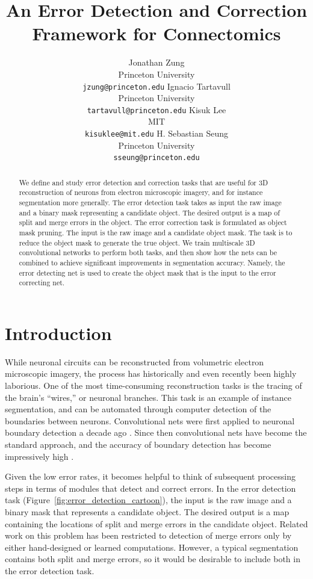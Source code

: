 \documentclass{article}
\title{An Error Detection and Correction Framework for Connectomics}
\author{
	Jonathan Zung\\
	Princeton University\\
	{\tt jzung@princeton.edu}
	\And
	Ignacio Tartavull\\
	Princeton University\\
	{\tt tartavull@princeton.edu}
	\And
	Kisuk Lee\\
	MIT\\
	{\tt kisuklee@mit.edu}
	\And
    H. Sebastian Seung\\
	Princeton University\\
	{\tt sseung@princeton.edu}
}
\begin{document}
\maketitle

\begin{abstract}
We define and study error detection and correction tasks that are
useful for 3D reconstruction of neurons from electron microscopic
imagery, and for instance segmentation more generally.  The error
detection task takes as input the raw image and a binary mask
representing a candidate object. The desired output is a map of split
and merge errors in the object. The error correction task is
formulated as object mask pruning. The input is the raw image
and a candidate object mask. The task is to reduce the object mask to
generate the true object. We train multiscale 3D convolutional
networks to perform both tasks, and then show how the nets can be
combined to achieve significant improvements in segmentation
accuracy. Namely, the error detecting net is used to create the
object mask that is the input to the error correcting net.
\end{abstract}

\section{Introduction}
While neuronal circuits can be reconstructed from volumetric electron
microscopic imagery, the process has historically
\cite{white1986structure} and even recently \cite{schmidt2017axonal}
been highly laborious. One of the most time-consuming reconstruction
tasks is the tracing of the brain's ``wires,'' or neuronal branches.
This task is an example of instance segmentation, and can be automated through computer detection of the boundaries between neurons. Convolutional nets were first applied to neuronal boundary detection a decade ago \cite{jain2007supervised, boundary_detection}.
Since then convolutional nets have become the standard approach, and
the accuracy of boundary detection has become impressively high  \cite{zeng2017deep, beier2017multicut, kisuk, funke2017deep}.

Given the low error rates, it becomes helpful to think of subsequent processing steps in terms of modules that detect and correct errors. In the error detection task (Figure~\ref{fig:error_detection_cartoon}), the input is the raw image and a binary mask that represents a candidate object. The desired output is a map containing the locations of split and merge errors in the candidate object. Related work on this problem has been restricted to detection of merge errors only by either hand-designed \cite{multipass} or learned \cite{mergenet} computations. However, a typical segmentation contains both split and merge errors, so it would be desirable to include both in the error detection task.
\end{document}
